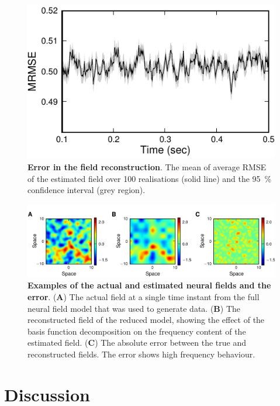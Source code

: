 \documentclass[10pt]{article}
\begin{document}
  \begin{figure}
   	\begin{center}
   		\includegraphics{./Graph/MRMSE.pdf} 
   	\end{center}
   	\caption{{\bf Error in the field reconstruction}. The mean of average RMSE of the estimated field over 100 realisations (solid line) and the 95~\% confidence interval (grey region).} 
\label{fig:RMSE}
   \end{figure}
  
\begin{figure}
\centering 
\label{fig:TrueField}\includegraphics{./Graph/FieldTrueEstimationError.pdf}
\caption{{\bf Examples of the actual and estimated neural fields and the error}. (\textbf{A}) The actual field at a single time instant from the full neural field model that was used to generate data. (\textbf{B}) The reconstructed field of the reduced model, showing the effect of the basis function decomposition on the frequency content of the estimated field. (\textbf{C}) The absolute error between the true and reconstructed fields. The error shows high frequency behaviour.}
\label{fig:FieldEstimate}
\end{figure}

\section*{Discussion}
\label{DiscussionSection}
\end{document}

